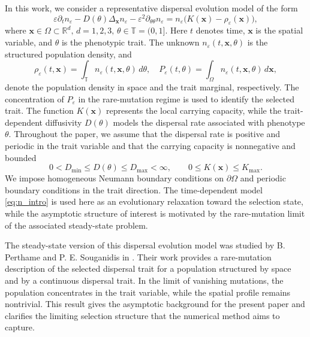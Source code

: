 \documentclass[11pt]{article}
\begin{document}
In this work, we consider a representative dispersal evolution model of the form 
\begin{equation}\label{eq:n_intro} 
	\varepsilon \partial_t n_\varepsilon -D(\theta)\Delta_{\mathbf{x}} n_\varepsilon -\varepsilon^2\partial_{\theta\theta} n_\varepsilon = n_\varepsilon\bigl(K(\mathbf{x})-\rho_\varepsilon(\mathbf{x})\bigr), 
\end{equation} 
where $\mathbf{x}\in\Omega\subset \mathbb{R}^d, \, d=1,2,3, \, \theta \in \mathbb{T}=(0,1].$
Here \(t\) denotes time, \(\mathbf{x}\) is the spatial variable, and \(\theta\) is the phenotypic trait. The unknown
\(n_\varepsilon(t,\mathbf{x},\theta)\) is the structured population density, and 
\begin{equation} \label{def:rho_P}
	\rho_\varepsilon(t,\mathbf{x}) = \int_{\mathbb T} n_\varepsilon(t,\mathbf{x},\theta)\,d\theta, \quad 
	P_\varepsilon(t,\theta) = \int_\Omega n_\varepsilon(t,\mathbf{x},\theta)\,d\mathbf{x},  
\end{equation}
denote the population density in space and the trait marginal, respectively. 
The concentration of \(P_\varepsilon\) in the rare-mutation regime is used to identify the selected trait. 
The function \(K(\mathbf{x})\) represents the local carrying capacity, while the trait-dependent diffusivity \(D(\theta)\) models the dispersal rate associated with phenotype \(\theta\). Throughout the paper, we assume that the dispersal rate is positive and periodic in the trait variable and that the carrying capacity is nonnegative and bounded \cite{PerthameSouganidis}
 \begin{equation}\label{eq:basic_assumptions} 
 	0<D_{\min}\le D(\theta)\le D_{\max}<\infty, \qquad 0\le K(\mathbf{x})\le K_{\max}. 
\end{equation} 
We impose homogeneous Neumann boundary conditions on \(\partial\Omega\) and periodic boundary conditions in the trait direction. The time-dependent model \eqref{eq:n_intro} is used here as an evolutionary relaxation toward the selection state, while the asymptotic structure of interest is motivated by the rare-mutation limit of the associated steady-state problem.


The steady-state version of this dispersal evolution model was studied by
B. Perthame and P. E. Souganidis in \cite{PerthameSouganidis}.  Their work provides a
rare-mutation description of the selected dispersal trait for a population
structured by space and by a continuous dispersal trait.  In the limit of
vanishing mutations, the population concentrates in the trait variable, while
the spatial profile remains nontrivial.  This result gives the asymptotic
background for the present paper and clarifies the limiting selection structure
that the numerical method aims to capture.
\end{document}
